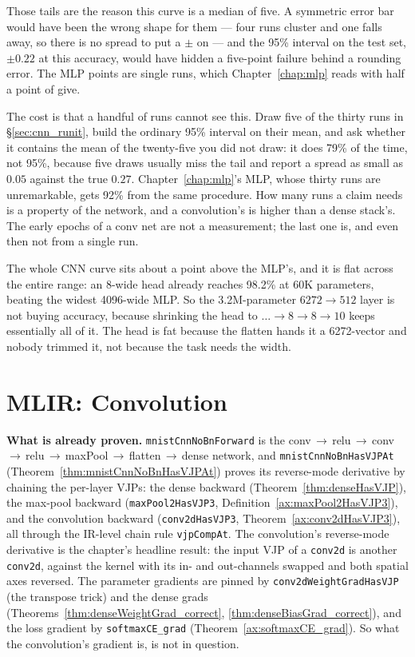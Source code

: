 \medskip\noindent Those tails are the reason this curve is a median of five. A symmetric error bar would have
been the wrong shape for them --- four runs cluster and one falls away, so
there is no spread to put a $\pm$ on --- and the 95\% interval on the test
set, $\pm 0.22$ at this accuracy, would have hidden a five-point failure
behind a rounding error. The MLP points are single runs, which
Chapter~\ref{chap:mlp} reads with half a point of give.

\medskip\noindent The cost is that a handful of runs cannot see this.
Draw five of the thirty runs in \S\ref{sec:cnn_runit}, build the ordinary 95\% interval on their mean,
and ask whether it contains the mean of the twenty-five you did not
draw: it does 79\% of the time, not 95\%, because five draws usually miss
the tail and report a spread as small as $0.05$ against the true $0.27$.
Chapter~\ref{chap:mlp}'s MLP, whose thirty runs are unremarkable, gets
92\% from the same procedure. How many runs a claim needs is a property
of the network, and a convolution's is higher than a dense stack's. The
early epochs of a conv net are not a measurement; the last one is, and
even then not from a single run.

\medskip\noindent The whole CNN curve sits about a point above the MLP's, and it is flat
across the entire range: an 8-wide head already reaches 98.2\% at 60K
parameters, beating the widest 4096-wide MLP. So the 3.2M-parameter
$6272{\to}512$ layer is not buying accuracy, because shrinking the head
to $\ldots{\to}8{\to}8{\to}10$ keeps essentially all of it. The head is fat
because the flatten hands it a 6272-vector and nobody trimmed it, not
because the task needs the width.

\section{MLIR: Convolution}

\noindent\textbf{What is already proven.} \texttt{mnistCnnNoBnForward} is
the conv\,$\to$\,relu\,$\to$\,conv\,$\to$\,relu\,$\to$\,maxPool\,$\to$\,flatten\,$\to$\,dense
network, and \texttt{mnistCnnNoBnHasVJPAt}
(Theorem~\ref{thm:mnistCnnNoBnHasVJPAt}) proves its reverse-mode
derivative by chaining the per-layer VJPs: the dense backward
(Theorem~\ref{thm:denseHasVJP}), the
max-pool backward (\texttt{maxPool2HasVJP3},
Definition~\ref{ax:maxPool2HasVJP3}), and the convolution backward
(\texttt{conv2dHasVJP3}, Theorem~\ref{ax:conv2dHasVJP3}), all through the
IR-level chain rule \texttt{vjpCompAt}. The convolution's reverse-mode
derivative is the chapter's headline result: the input VJP of a
\texttt{conv2d} is another \texttt{conv2d}, against the kernel with
its in- and out-channels swapped and both spatial axes reversed. The
parameter gradients are pinned by \texttt{conv2dWeightGradHasVJP}
(the transpose trick) and the dense grads (Theorems~\ref{thm:denseWeightGrad_correct},
\ref{thm:denseBiasGrad_correct}), and
the loss gradient by \texttt{softmaxCE\_grad} (Theorem~\ref{ax:softmaxCE_grad}).
So what the convolution's gradient is, is not in question.

